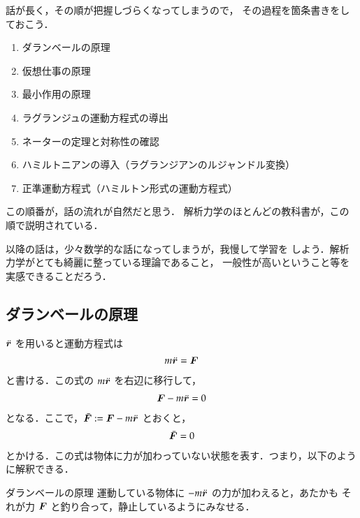             話が長く，その順が把握しづらくなってしまうので，
            その過程を箇条書きをしておこう．
                \begin{enumerate}
                    \item ダランベールの原理
                    \item 仮想仕事の原理
                    \item 最小作用の原理
                    \item ラグランジュの運動方程式の導出
                    \item ネーターの定理と対称性の確認
                    \item ハミルトニアンの導入（ラグランジアンのルジャンドル変換）
                    \item 正準運動方程式（ハミルトン形式の運動方程式）
                \end{enumerate}

            この順番が，話の流れが自然だと思う．
            解析力学のほとんどの教科書が，この順で説明されている．

            以降の話は，少々数学的な話になってしまうが，我慢して学習を
            しよう．解析力学がとても綺麗に整っている理論であること，
            一般性が高いということ等を実感できることだろう．

        \subsection{ダランベールの原理}
            $\ddot{\boldsymbol{r}}$ を用いると運動方程式は
                \begin{align}
                    m\ddot{\boldsymbol{r}} = \boldsymbol{F}
                \end{align}
            と書ける．この式の $m\ddot{\boldsymbol{r}}$ を右辺に移行して，
                \begin{align}
                    \boldsymbol{F}-m\ddot{\boldsymbol{r}} = 0
                \end{align}
            となる．ここで，$\bar{\boldsymbol{F}} := \boldsymbol{F}-m\ddot{\boldsymbol{r}}$ とおくと，
                \begin{align}
                    \bar{\boldsymbol{F}} = 0
                \end{align}
            とかける．この式は物体に力が加わっていない状態を表す．つまり，以下のように解釈できる．
                \begin{myshadebox}{ダランベールの原理}
                    運動している物体に $-m\ddot{\boldsymbol{r}}$ の力が加わえると，あたかも
                    それが力 $\boldsymbol{F}$ と釣り合って，静止しているようにみなせる．
                \end{myshadebox}

